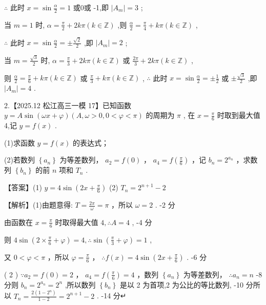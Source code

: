\documentclass[10pt]{article}
\begin{document}
\(\therefore\) 此时 \(x = \sin \frac{\alpha }{2} = 1\) 或0或 -1,即 \(\left| {A}_{m}\right|  = 3\) ;

当 \(m = 1\) 时, \(\alpha  = \frac{\pi }{2} + {2k\pi }\left( {k \in  \mathbb{Z}}\right)\) ,则 \(\frac{\alpha }{2} = \frac{\pi }{4} + {k\pi }\left( {k \in  \mathbb{Z}}\right)\) ,

\(\therefore\) 此时 \(x = \sin \frac{\alpha }{2} =  \pm  \frac{\sqrt{2}}{2}\) ,即 \(\left| {A}_{m}\right|  = 2\) ;

当 \(m = \frac{\sqrt{3}}{2}\) 时, \(\alpha  = \frac{\pi }{3} + {2k\pi }\left( {k \in  \mathbb{Z}}\right)\) 或 \(\frac{2\pi }{3} + {2k\pi }\left( {k \in  \mathbb{Z}}\right)\) ,

则 \(\frac{\alpha }{2} = \frac{\pi }{6} + {k\pi }\left( {k \in  \mathbb{Z}}\right)\) 或 \(\frac{\pi }{3} + {k\pi }\left( {k \in  \mathbb{Z}}\right)\) , \(\therefore\) 此时 \(x = \sin \frac{\alpha }{2} =  \pm  \frac{1}{2}\) 或 \(\pm  \frac{\sqrt{3}}{2}\) ,即 \(\left| {A}_{m}\right|  = 4\) .

2.【2025.12 松江高三一模 17】已知函数 \(y = A\sin \left( {{\omega x} + \varphi }\right) \left( {A,\omega  > 0,0 < \varphi  < \pi }\right)\) 的周期为 \(\pi\) , 在 \(x = \frac{\pi }{6}\) 时取到最大值 4,记 \(y = f\left( x\right)\) .

(1)求函数 \(y = f\left( x\right)\) 的表达式；

(2)若数列 \(\left\{  {a}_{n}\right\}\) 为等差数列， \({a}_{2} = f\left( 0\right)\) ， \({a}_{4} = f\left( \frac{\pi }{6}\right)\) ，记 \({b}_{n} = {2}^{{a}_{n}}\) ，求数列 \(\left\{  {b}_{n}\right\}\) 的前 \(n\) 项和 \({T}_{n}\) .

【答案】(1) \(y = 4\sin \left( {{2x} + \frac{\pi }{6}}\right)\) (2) \({T}_{n} = {2}^{n + 1} - 2\)

【解析】(1)由题意得: \(T = \frac{2\pi }{\omega } = \pi\) ，所以 \(\omega  = 2\) . -2 分

由函数在 \(x = \frac{\pi }{6}\) 时取得最大值 \(4,\therefore A = 4\) , -4 分

则 \(4\sin \left( {2 \times  \frac{\pi }{6} + \varphi }\right)  = 4,\therefore \sin \left( {\frac{\pi }{3} + \varphi }\right)  = 1\) ,

又 \(0 < \varphi  < \pi\) ，所以 \(\varphi  = \frac{\pi }{6}\) ， \(\therefore f\left( x\right)  = 4\sin \left( {{2x} + \frac{\pi }{6}}\right)\) . -6 分

( 2 ) \(\because {a}_{2} = f\left( 0\right)  = 2\) ， \({a}_{4} = f\left( \frac{\pi }{6}\right)  = 4\) ，数列 \(\left\{  {a}_{n}\right\}\) 为等差数列， \(\therefore {a}_{n} = n\) -8 分则 \({b}_{n} = {2}^{{a}_{n}} = {2}^{n}\) ,所以数列 \(\left\{  {b}_{n}\right\}\) 是以 2 为首项,2 为公比的等比数列, -10 分所以 \({T}_{n} = \frac{2\left( {1 - {2}^{n}}\right) }{1 - 2} = {2}^{n + 1} - 2\) . -14 分↵
\end{document}
